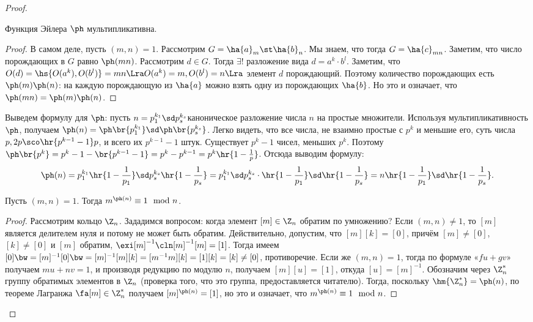 \documentclass[a4paper]{article}
\begin{document}
\begin{proof}
\begin{theorem}
Функция Эйлера $\ph$ мультипликативна.
\end{theorem}
\begin{proof}
В самом деле, пусть $(m,n)=1$. Рассмотрим $G = \ha{a}_m\st\ha{b}_n$. Мы знаем,  что тогда $G = \ha{c}_{mn}$.
Заметим, что число порождающих в $G$ равно $\ph(mn)$. Рассмотрим $d \in G$. Тогда $\exi!$ разложение вида
$d=a^k\cdot b^l$. Заметим, что $O(d)=\hs{O(a^k), O(b^l)} = mn \Lra O(a^k) =m, O(b^l)=n \Lra$ элемент $d$\т
порождающий. Поэтому количество порождающих есть $\ph(m)\ph(n)$: на каждую порождающую из $\ha{a}$ можно
взять одну из порождающих $\ha{b}$. Но это и означает, что $\ph(mn)=\ph(m)\ph(n)$.
\end{proof}

Выведем формулу для $\ph$: пусть $n=p_1^{k_1}\sd p_s^{k_s}$\т каноническое  разложение числа $n$ на простые
множители. Используя мультипликативность $\ph$, получаем $\ph(n)=\ph\br{p_1^{k_1}}\sd \ph\br{p_s^{k_s}}$.
Легко видеть, что все числа, не взаимно простые с $p^k$ и меньшие его, суть числа $p,2p\sco \hr{p^{k-1}-1}p$,
и всего их $p^{k-1}-1$ штук. Существует $p^k-1$ чисел, меньших $p^k$. Поэтому $\ph\br{p^k}=p^k-1 -
\br{p^{k-1}-1}=p^k-p^{k-1}=p^k\hr{1-\frac{1}{p}}$. Отсюда выводим формулу:
$$\ph(n)=p_1^{k_1}\hr{1-\frac{1}{p_1}}\sd p_s^{k_s}\hr{1-\frac{1}{p_s}}= p_1^{k_1}\sd
p_s^{k_s}\cdot\hr{1-\frac{1}{p_1}}\sd\hr{1-\frac{1}{p_s}}=n\hr{1-\frac{1}{p_1}}\sd \hr{1-\frac{1}{p_s}}.$$

\begin{theorem}
Пусть $(m,n)=1$. Тогда $m^{\ph(n)}\equiv 1 \mod n$.
\end{theorem}
\begin{proof}
Рассмотрим кольцо $\Z_n$. Зададимся вопросом: когда элемент $[m] \in \Z_n$ обратим по умножению? Если
$(m,n)\neq 1$, то $[m]$ является делителем нуля и потому не может быть обратим. Действительно, допустим, что
$[m][k] = [0]$, причём $[m] \neq [0]$, $[k] \neq [0]$ и $[m]$ обратим,  $\exi [m]^{-1}\cln [m]^{-1}[m]=[1]$.
Тогда имеем $[0]\bw=[m]^{-1}[0]\bw=[m]^{-1}[m][k]=[m^{-1}m][k]=[1][k]=[k]\neq [0]$, противоречие. Если же
$(m,n)=1$, тогда по формуле «$fu+gv$» получаем $mu+nv=1$, и производя редукцию по модулю $n$, получаем
$[m][u]=[1]$, откуда $[u]=[m]^{-1}$. Обозначим через $\Z_n^*$ группу обратимых элементов в $\Z_n$ (проверка
того, что это группа, предоставляется читателю). Тогда, поскольку $\hm{\Z_n^*}=\ph(n)$, по теореме Лагранжа
$\fa [m] \in \Z_n^*$ получаем  $[m]^{\ph(n)}=[1]$, но это и означает, что $m^{\ph(n)} \equiv 1 \mod n$.
\end{proof}


\end{proof}
\end{document}
